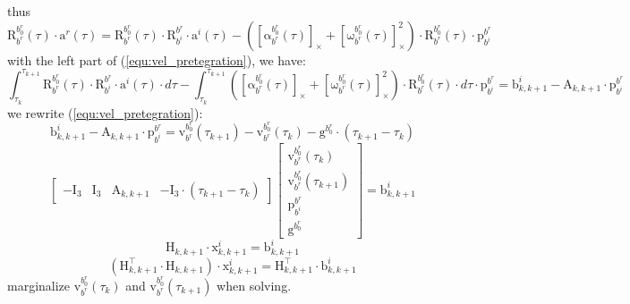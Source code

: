 \documentclass[12pt, onecolumn]{article}
\newcommand\liehat[1]{\left[ #1 \right]_\times}
\newcommand\bsm[1]{\boldsymbol{\mathrm{#1}}}
\newcommand\rotation[2]{{\bsm{R}_{#1}^{#2}}}
\newcommand\angvel[2]{{\bsm{\omega}_{#1}^{#2}}}
\newcommand\angacce[2]{{\bsm{\alpha}_{#1}^{#2}}}
\newcommand\translation[2]{{\bsm{p}_{#1}^{#2}}}
\newcommand\linvel[2]{{\bsm{v}_{#1}^{#2}}}
\newcommand\gravity[1]{{\bsm{g}^{#1}}}
\begin{document}
	thus
	\begin{equation}
	\rotation{b^r}{b^r_0}(\tau) \cdot\bsm{a}^r(\tau)
	=\rotation{b^r}{b^r_0}(\tau) \cdot\rotation{b^i}{b^r} \cdot\bsm{a}^i(\tau) -\left(\liehat{\angacce{b^r}{b^r_0}(\tau)}+ \liehat{\angvel{b^r}{b^r_0}(\tau)}^2\right) \cdot\rotation{b^r}{b^r_0}(\tau)\cdot\translation{b^i}{b^r}
	\end{equation}
	with the left part of (\ref{equ:vel_pretegration}), we have:
	\begin{equation}
	\int_{\tau_k}^{\tau_{k+1}}\rotation{b^r}{b^r_0}(\tau) \cdot\rotation{b^i}{b^r} \cdot\bsm{a}^i(\tau) \cdot d\tau-
	\int_{\tau_k}^{\tau_{k+1}}\left(\liehat{\angacce{b^r}{b^r_0}(\tau)}+ \liehat{\angvel{b^r}{b^r_0}(\tau)}^2\right) \cdot\rotation{b^r}{b^r_0}(\tau)\cdot d\tau\cdot\translation{b^i}{b^r}
	=\bsm{b}^i_{k,k+1}-\bsm{A}_{k,k+1}\cdot\translation{b^i}{b^r}
	\end{equation}
	we rewrite (\ref{equ:vel_pretegration}):
	\begin{equation}
	\bsm{b}^i_{k,k+1}-\bsm{A}_{k,k+1}\cdot\translation{b^i}{b^r}=
	\linvel{b^r}{b^r_0}(\tau_{k+1})-\linvel{b^r}{b^r_0}(\tau_k)-\gravity{b^r_0}\cdot\left(\tau_{k+1}-\tau_k \right) 
	\end{equation}
	\begin{equation}
	\begin{bmatrix}
	-\bsm{I}_3&\bsm{I}_3&\bsm{A}_{k,k+1}&-\bsm{I}_3\cdot\left(\tau_{k+1}-\tau_k \right) 
	\end{bmatrix}
	\begin{bmatrix}
	\linvel{b^r}{b^r_0}(\tau_k)
	\\
	\linvel{b^r}{b^r_0}(\tau_{k+1})
	\\
	\translation{b^i}{b^r}
	\\
	\gravity{b^r_0}
	\end{bmatrix}=\bsm{b}^i_{k,k+1}
	\end{equation}
	\begin{equation}
	\bsm{H}_{k,k+1}\cdot\bsm{x}^i_{k,k+1}=\bsm{b}^i_{k,k+1}
	\end{equation}
	\begin{equation}
	\left( \bsm{H}_{k,k+1}^\top\cdot\bsm{H}_{k,k+1}\right) \cdot\bsm{x}^i_{k,k+1}=\bsm{H}_{k,k+1}^\top\cdot\bsm{b}^i_{k,k+1}
	\end{equation}
	marginalize $\linvel{b^r}{b^r_0}(\tau_k)$ and $\linvel{b^r}{b^r_0}(\tau_{k+1})$ when solving.
	
\end{document}
